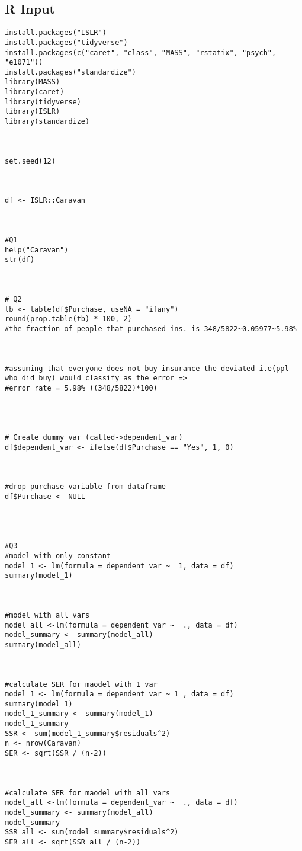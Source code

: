 \documentclass{article}
\begin{document}
\subsection{R Input}
\begin{verbatim}
install.packages("ISLR")
install.packages("tidyverse")
install.packages(c("caret", "class", "MASS", "rstatix", "psych", "e1071"))
install.packages("standardize")
library(MASS)
library(caret)
library(tidyverse)
library(ISLR)
library(standardize)



set.seed(12)



df <- ISLR::Caravan



#Q1
help("Caravan")
str(df)



# Q2
tb <- table(df$Purchase, useNA = "ifany")
round(prop.table(tb) * 100, 2)
#the fraction of people that purchased ins. is 348/5822~0.05977~5.98%



#assuming that everyone does not buy insurance the deviated i.e(ppl who did buy) would classify as the error =>
#error rate = 5.98% ((348/5822)*100)




# Create dummy var (called->dependent_var) 
df$dependent_var <- ifelse(df$Purchase == "Yes", 1, 0)



#drop purchase variable from dataframe
df$Purchase <- NULL




#Q3
#model with only constant
model_1 <- lm(formula = dependent_var ~  1, data = df)
summary(model_1)



#model with all vars
model_all <-lm(formula = dependent_var ~  ., data = df)
model_summary <- summary(model_all)
summary(model_all)



#calculate SER for maodel with 1 var
model_1 <- lm(formula = dependent_var ~ 1 , data = df)
summary(model_1)
model_1_summary <- summary(model_1)
model_1_summary
SSR <- sum(model_1_summary$residuals^2)
n <- nrow(Caravan)
SER <- sqrt(SSR / (n-2))



#calculate SER for maodel with all vars
model_all <-lm(formula = dependent_var ~  ., data = df)
model_summary <- summary(model_all)
model_summary
SSR_all <- sum(model_summary$residuals^2)
SER_all <- sqrt(SSR_all / (n-2))





\end{verbatim}
\end{document}
